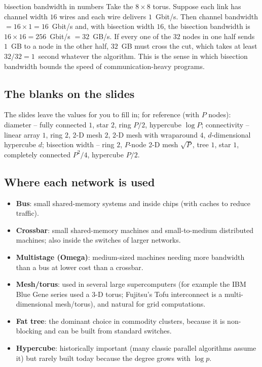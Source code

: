 \begin{workedex}{bisection bandwidth in numbers}
Take the $8\times8$ torus. Suppose each link has channel width $16$ wires and each wire delivers $1$~Gbit/s. Then channel bandwidth $=16\times1=16$~Gbit/s and,
with bisection width $16$, the bisection bandwidth is $16\times16=256$~Gbit/s $=32$~GB/s.
If every one of the $32$ nodes in one half sends $1$~GB to a node in the other half, $32$~GB must cross the cut, which takes at least $32/32=1$~second whatever the algorithm. This is the
sense in which bisection bandwidth bounds the speed of communication-heavy programs.
\end{workedex}

\subsection{The blanks on the slides}

The slides leave the values for you to fill in; for reference (with $P$ nodes):
diameter -- fully connected $1$, star $2$, ring $P/2$, hypercube $\log P$;
connectivity -- linear array $1$, ring $2$, 2-D mesh $2$, 2-D mesh with wraparound $4$, $d$-dimensional hypercube $d$;
bisection width -- ring $2$, $P$-node 2-D mesh $\sqrt P$, tree $1$, star $1$, completely connected $P^2/4$, hypercube $P/2$.

\subsection{Where each network is used}

\begin{itemize}
  \item \textbf{Bus}: small shared-memory systems and inside chips (with caches to reduce traffic).
  \item \textbf{Crossbar}: small shared-memory machines and small-to-medium distributed machines; also inside the switches of larger networks.
  \item \textbf{Multistage (Omega)}: medium-sized machines needing more bandwidth than a bus at lower cost than a crossbar.
  \item \textbf{Mesh/torus}: used in several large supercomputers (for example the IBM Blue Gene series used a 3-D torus; Fujitsu's Tofu interconnect is a multi-dimensional mesh/torus), and natural for grid computations.
  \item \textbf{Fat tree}: the dominant choice in commodity clusters, because it is non-blocking and can be built from standard switches.
  \item \textbf{Hypercube}: historically important (many classic parallel algorithms assume it) but rarely built today because the degree grows with $\log p$.
\end{itemize}

